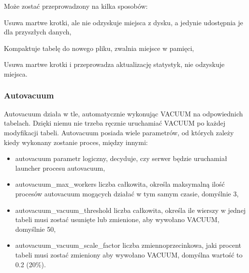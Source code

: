\documentclass[a4paper,11pt,openany,english]{sphinxmanual}
\begin{document}
\sphinxAtStartPar
Może zostać przeprowadzony na kilka sposobów:

\begin{sphinxVerbatim}[commandchars=\\\{\}]
\end{sphinxVerbatim}

\sphinxAtStartPar
Usuwa martwe krotki, ale nie odzyskuje miejsca z dysku, a jedynie udostępnia je dla przyszłych danych,

\begin{sphinxVerbatim}[commandchars=\\\{\}]
\end{sphinxVerbatim}

\sphinxAtStartPar
Kompaktuje tabelę do nowego pliku, zwalnia miejsce w pamięci,

\begin{sphinxVerbatim}[commandchars=\\\{\}]
\end{sphinxVerbatim}

\sphinxAtStartPar
Usuwa martwe krotki i przeprowadza aktualizację statystyk, nie odzyskuje miejsca.


\subsubsection{Autovacuum}
\label{\detokenize{rozdzial2/Kontrola_i_konserwacja/kontrola_i_konserwacja:autovacuum}}
\sphinxAtStartPar
Autovacuum działa w tle, automatycznie wykonując VACUUM na odpowiednich tabelach. Dzięki niemu nie trzeba ręcznie uruchamiać VACUUM po każdej modyfikacji tabeli. Autovacuum posiada wiele parametrów, od których zależy kiedy wykonany zostanie proces, między innymi:
\begin{itemize}
\item {} 
\sphinxAtStartPar
autovacuum \sphinxhyphen{} parametr logiczny, decyduje, czy serwer będzie uruchamiał launcher procesu autovacuum,

\item {} 
\sphinxAtStartPar
autovacuum\_max\_workers \sphinxhyphen{} liczba całkowita, określa maksymalną ilość procesów autovacuum mogących działać w tym samym czasie, domyślnie 3,

\item {} 
\sphinxAtStartPar
autovacuum\_vacuum\_threshold \sphinxhyphen{} liczba całkowita, określa ile wierszy w jednej tabeli musi zostać usunięte lub zmienione, aby wywołano VACUUM, domyślnie 50,

\item {} 
\sphinxAtStartPar
autovacuum\_vacuum\_scale\_factor \sphinxhyphen{} liczba zmiennoprzecinkowa, jaki procent tabeli musi zostać zmieniony aby wywołano VACUUM, domyślna wartość to 0.2 (20\%).

\end{itemize}
\end{document}
